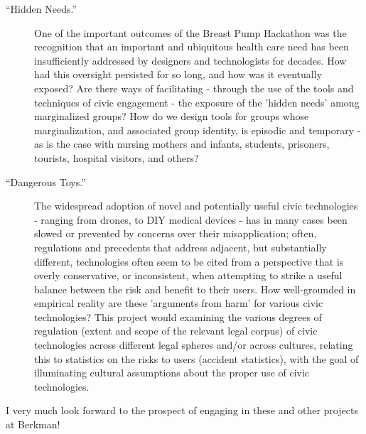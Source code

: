\documentclass[10pt]{article}
\begin{document}
\begin{description}

\item[``Hidden Needs.''] One of the important outcomes of the Breast Pump Hackathon was the recognition that an important and ubiquitous health care need has been insufficiently addressed by designers and technologists for decades. How had this oversight persisted for so long, and how was it eventually exposed?  Are there ways of facilitating - through the use of the tools and techniques of civic engagement - the exposure of the 'hidden needs' among marginalized groups?  How do we design tools for groups whose marginalization, and associated group identity, is episodic and temporary - as is the case with nursing mothers and infants, students, prisoners, tourists, hospital visitors, and others?

\item[``Dangerous Toys.''] The widespread adoption of novel and potentially useful civic technologies - ranging from drones, to DIY medical devices - has in many cases been slowed or prevented by concerns over their misapplication; often, regulations and precedents that address adjacent, but substantially different, technologies often seem to be cited from a perspective that is overly conservative, or inconsistent, when attempting to strike a useful balance between the risk and benefit to their users. How well-grounded in empirical reality are these 'arguments from harm' for various civic technologies?  This project would examining the various degrees of regulation (extent and scope of the relevant legal corpus) of civic technologies across different legal spheres and/or across cultures, relating this to statistics on the risks to users (accident statistics), with the goal of illuminating cultural assumptions about the proper use of civic technologies. 


\end{description}

I very much look forward to the prospect of engaging in these and other projects at Berkman!
\end{document}
